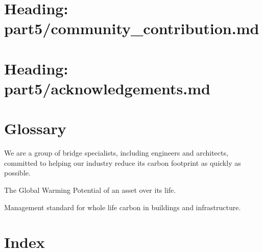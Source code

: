 \documentclass[letterpaper,10pt,english]{jupyterBook}
\begin{document}
\chapter{Heading: part5/community\_contribution.md}
\label{\detokenize{part5/community_contribution:heading-part5-community-contribution-md}}\label{\detokenize{part5/community_contribution::doc}}
\sphinxstepscope


\chapter{Heading: part5/acknowledgements.md}
\label{\detokenize{part5/acknowledgements:heading-part5-acknowledgements-md}}\label{\detokenize{part5/acknowledgements::doc}}
\sphinxstepscope


\chapter{Glossary}
\label{\detokenize{part5/glossary:glossary}}\label{\detokenize{part5/glossary::doc}}\begin{description}
\sphinxAtStartPar
We are a group of bridge specialists, including engineers and architects, committed to helping our industry reduce its carbon footprint as quickly as possible.

\sphinxAtStartPar
The Global Warming Potential of an asset over its life.

\sphinxAtStartPar
Management standard for whole life carbon in buildings and infrastructure.

\end{description}

\sphinxstepscope


\chapter{Index}
\label{\detokenize{part5/genindex:index}}\label{\detokenize{part5/genindex::doc}}






\renewcommand{\indexname}{Index}
\printindex
\end{document}
